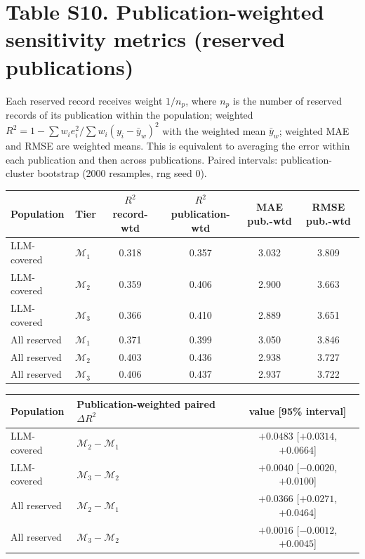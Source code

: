 \documentclass[10pt]{article}
\begin{document}
\section*{Table S10. Publication-weighted sensitivity metrics (reserved publications)}
Each reserved record receives weight $1/n_p$, where $n_p$ is the number of reserved records of its publication within the population; weighted $R^2=1-\sum w_ie_i^2/\sum w_i(y_i-\bar y_w)^2$ with the weighted mean $\bar y_w$; weighted MAE and RMSE are weighted means. This is equivalent to averaging the error within each publication and then across publications. Paired intervals: publication-cluster bootstrap (2000 resamples, rng seed 0).\par\smallskip
\begin{tabular}{llcccc}\toprule Population & Tier & $R^2$ record-wtd & $R^2$ publication-wtd & MAE pub.-wtd & RMSE pub.-wtd\\\midrule
LLM-covered & $\mathcal{M}_1$ & 0.318 & 0.357 & 3.032 & 3.809\\
LLM-covered & $\mathcal{M}_2$ & 0.359 & 0.406 & 2.900 & 3.663\\
LLM-covered & $\mathcal{M}_3$ & 0.366 & 0.410 & 2.889 & 3.651\\
All reserved & $\mathcal{M}_1$ & 0.371 & 0.399 & 3.050 & 3.846\\
All reserved & $\mathcal{M}_2$ & 0.403 & 0.436 & 2.938 & 3.727\\
All reserved & $\mathcal{M}_3$ & 0.406 & 0.437 & 2.937 & 3.722\\
\midrule
\end{tabular}\par\smallskip
\begin{tabular}{llc}\toprule Population & Publication-weighted paired $\Delta R^2$ & value [95\% interval]\\\midrule
LLM-covered & $\mathcal{M}_2-\mathcal{M}_1$ & $+0.0483$ [$+0.0314$, $+0.0664$]\\
LLM-covered & $\mathcal{M}_3-\mathcal{M}_2$ & $+0.0040$ [$-0.0020$, $+0.0100$]\\
All reserved & $\mathcal{M}_2-\mathcal{M}_1$ & $+0.0366$ [$+0.0271$, $+0.0464$]\\
All reserved & $\mathcal{M}_3-\mathcal{M}_2$ & $+0.0016$ [$-0.0012$, $+0.0045$]\\
\bottomrule\end{tabular}\par
\end{document}
